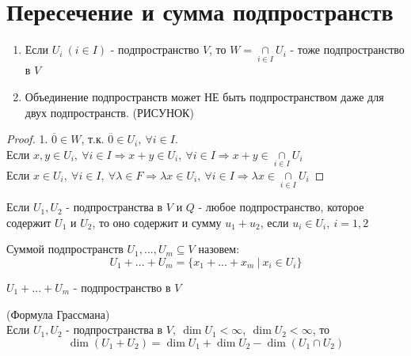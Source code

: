 \section{Пересечение и сумма подпространств}
  \begin{subtheorem}\tab
    \begin{enumerate}
      \item Если $U_i \ (i\in I)$ - подпространство $V$, то $W = \underset{i\in I}{\cap}U_i$ - тоже подпространство в $V$
      \item Объединение подпространств может НЕ быть подпространством даже для двух подпространств.
      (РИСУНОК)
    \end{enumerate}
  \end{subtheorem} 
  \begin{proof}
    1. $\overline{0} \in W$, т.к. $\overline{0} \in U_i, \ \forall i\in I$. \vspace{0.2cm}\\
    Если $x,y \in U_i, \ \forall i\in I \Longrightarrow x+y \in U_i, \ \forall i\in I \Longrightarrow x+y \in \underset{i\in I}{\cap}U_i$ \vspace{0.15cm}\\
    Если $x \in U_i, \ \forall i\in I, \ \forall \lambda \in F \Longrightarrow \lambda x \in U_i, \ \forall i\in I \Longrightarrow \lambda x \in \underset{i\in I}{\cap}U_i$  
  \end{proof}
  \begin{remark}
    Если $U_1, U_2$ - подпространства в $V$ и $Q$ - любое подпространство, которое содержит $U_1$ и $U_2$, то оно содержит и сумму $u_1+u_2$, если $u_i \in U_i, \ i =1,2$       
  \end{remark}
  \begin{definition}
    Суммой подпространств $U_1,...,U_m \subseteq V$ назовем: $$U_1 + ... + U_m = \{x_1+...+x_m \ | \ x_i \in U_i\}$$   
  \end{definition}
  \begin{subtheorem}
    $U_1 + ... + U_m$ - подпространство в $V$  
  \end{subtheorem}
  \begin{theorem} (Формула Грассмана)\\
    Если $U_1,U_2$ - подпространства в $V, \ \dim U_1 < \infty, \ \dim U_2 < \infty$, то 
    $$\dim (U_1+U_2) = \dim U_1 + \dim U_2 - \dim (U_1 \cap U_2)$$   
  \end{theorem}
